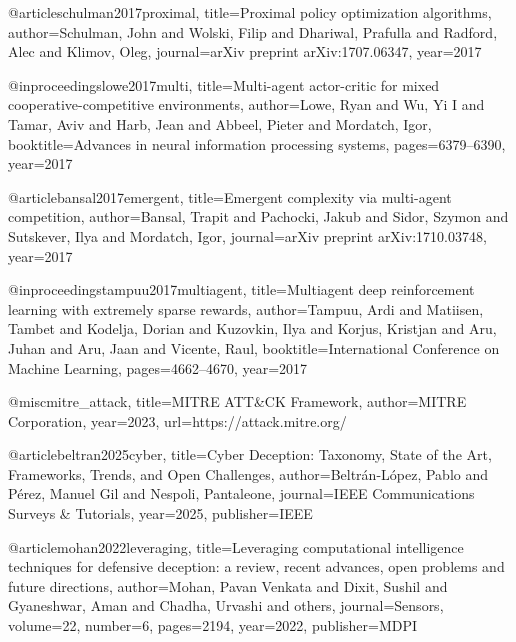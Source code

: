 @article{schulman2017proximal,
  title={Proximal policy optimization algorithms},
  author={Schulman, John and Wolski, Filip and Dhariwal, Prafulla and Radford, Alec and Klimov, Oleg},
  journal={arXiv preprint arXiv:1707.06347},
  year={2017}
}

@inproceedings{lowe2017multi,
  title={Multi-agent actor-critic for mixed cooperative-competitive environments},
  author={Lowe, Ryan and Wu, Yi I and Tamar, Aviv and Harb, Jean and Abbeel, Pieter and Mordatch, Igor},
  booktitle={Advances in neural information processing systems},
  pages={6379--6390},
  year={2017}
}

@article{bansal2017emergent,
  title={Emergent complexity via multi-agent competition},
  author={Bansal, Trapit and Pachocki, Jakub and Sidor, Szymon and Sutskever, Ilya and Mordatch, Igor},
  journal={arXiv preprint arXiv:1710.03748},
  year={2017}
}

@inproceedings{tampuu2017multiagent,
  title={Multiagent deep reinforcement learning with extremely sparse rewards},
  author={Tampuu, Ardi and Matiisen, Tambet and Kodelja, Dorian and Kuzovkin, Ilya and Korjus, Kristjan and Aru, Juhan and Aru, Jaan and Vicente, Raul},
  booktitle={International Conference on Machine Learning},
  pages={4662--4670},
  year={2017}
}

@misc{mitre_attack,
  title={MITRE ATT\&CK Framework},
  author={{MITRE Corporation}},
  year={2023},
  url={https://attack.mitre.org/}
}

@article{beltran2025cyber,
  title={Cyber Deception: Taxonomy, State of the Art, Frameworks, Trends, and Open Challenges},
  author={Beltr{\'a}n-L{\'o}pez, Pablo and P{\'e}rez, Manuel Gil and Nespoli, Pantaleone},
  journal={IEEE Communications Surveys \& Tutorials},
  year={2025},
  publisher={IEEE}
}

@article{mohan2022leveraging,
  title={Leveraging computational intelligence techniques for defensive deception: a review, recent advances, open problems and future directions},
  author={Mohan, Pavan Venkata and Dixit, Sushil and Gyaneshwar, Aman and Chadha, Urvashi and others},
  journal={Sensors},
  volume={22},
  number={6},
  pages={2194},
  year={2022},
  publisher={MDPI}
}
